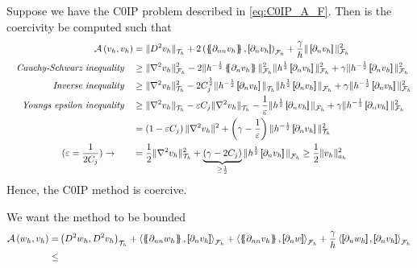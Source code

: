 Suppose we have the C0IP problem described in \eqref{eq:C0IP_A_F}. Then is the coercivity be computed such that
\[
    \begin{split}
\mathcal{A} \left( v_{h}, v_{h} \right) & = \| D^2v_{h} \|_{ \mathcal{T} _{h} }^{  }  + 2 \left(  \mean{ \partial _{nn} v_{h} }    ,  \jump{ \partial _{n}v_{h} }     \right) _{\mathcal{F} _{h}} +  \frac{\gamma}{h} \|  \jump{ \partial _{n} v_{h} }
  \|_{ \mathcal{F} _{h} }^{ 2 } \\
\quad \textit{Cauchy-Schwarz inequality} \quad
& \ge \| \nabla ^2 v_{h} \|_{ \mathcal{F} _{h} }^{2  } -2 \| h^{-\frac{1}{2}} \mean{ \partial _{n}v_{h} }    \|_{  \mathcal{F} _{h}}^{  2} \| h^{\frac{1}{2}} \jump{ \partial _{n}v_{h} }    \|_{  \mathcal{F} _{h}}^{  2} + \gamma \| h^{-\frac{1}{2}}  \jump{ \partial _{n}v_{h} }   \|_{ \mathcal{F} _{h}  }^{ 2 } \\
\quad \textit{Inverse inequality} \quad
 &  \ge  \| \nabla ^2 v_{h}  \|_{ \mathcal{T} _{h}  }^{ 2  } - 2 C^{\frac{1}{2}}_{j} \| h^{-\frac{1}{2}} \jump{ \partial _{n} v_{h} }   \|_{ \mathcal{T} _{h}  }^{  } \| h^{\frac{1}{2}} \jump{ \partial _{n} v_{h} }   \|_{ \mathcal{F} _{h} }^{  }  + \gamma \| h^{ -\frac{1}{2}} \jump{
 \partial _{n } v_{h}}   \|_{ \mathcal{F}_{h}}^{2}  \\
\quad \textit{ Youngs epsilon inequality} \quad
  &  \ge  \| \nabla ^2 v_{h} \|_{ \mathcal{T}_{h}  }^{  } - \varepsilon C_{j} \| \nabla ^2 v_{h} \|_{ \mathcal{T} _{h} }^{  } - \frac{1}{\varepsilon } \| h^{\frac{1}{2}} \jump{ \partial _{n} v_{h} }   \|_{ \mathcal{F} _{h} }^{  }  + \gamma \|
  h^{-\frac{1}{2}} \jump{ \partial _{n} v_{h}}   \|_{ \mathcal{F} _{h} }^{2  }  \\
  & =  \left( 1 - \varepsilon C_{j} \right) \| \nabla ^2 v_{h} \|_{  }^{ 2 } + \left( \gamma  - \frac{1}{\varepsilon } \right) \| h^{-\frac{1}{2}} \jump{ \partial _{n} v_{h} }   \|_{ \mathcal{T} _{h} }^{ 2 } \\
  (\varepsilon  = \frac{1}{2 C_{j} }) \to  \quad \quad &= \frac{1}{2} \| \nabla ^2 v_{h} \|_{ \mathcal{T} _{h} }^{ 2 }  + \underbrace{\left( \gamma -2 C_{j} \right)}_{ \ge  \frac{1}{2}}  \| h^{\frac{1}{2}} \jump{ \partial _{n} v_{h} }   \|_{
  \mathcal{F} _{h} }^{  } \ge \frac{1}{2} \| v_{h} \|_{ a_{h} }^{  2}    \\
    \end{split}
\]
Hence, the C0IP method is coercive.

We want the method to be bounded
\begin{equation*}
    \begin{split}
\mathcal{A} \left( w_{h}, v_{h} \right)   =&
    \left( D^2 w_{h}, D^2v_{h} \right) _{\mathcal{T} _{h}}
  +
  \left< \mean{  \partial _{n n} w_{h} }, \jump{ \partial _{n }v_{h}} \right>_{\mathcal{F}_{h}}  +
 \left< \mean{ \partial _{n n} v_{h} }, \jump{ \partial _{n}w }      \right>_{\mathcal{F}_{h}}
+ \frac{\gamma }{h}  \left< \jump{ \partial _{n} w_{h}}, \jump{ \partial _{n} v_{h}   }   \right>_{\mathcal{F}_{h}} \\
\le &
\end{split}
\end{equation*}

